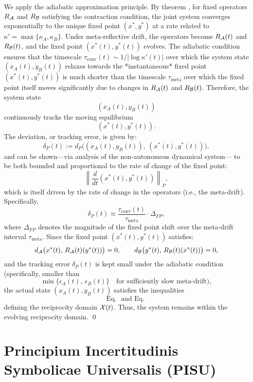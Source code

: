 \begin{demonstratio}
\label{demonstratio:bk7_meta_drift_reflective_tracking}
We apply the adiabatic approximation principle. By theorem , for fixed operators \(R_{\mathcal{A}}\) and \(R_{\mathcal{B}}\) satisfying the contraction condition, the joint system converges exponentially to the unique fixed point \((x^*, y^*)\) at a rate related to \(\kappa' = \max\{\kappa_A, \kappa_B\}\). Under meta-reflective drift, the operators become \(R_{\mathcal{A}}(t)\) and \(R_{\mathcal{B}}(t)\), and the fixed point \((x^*(t), y^*(t))\) evolves.
The adiabatic condition ensures that the timescale \(\tau_{\mathrm{conv}}(t) \sim 1/|\log \kappa'(t)|\) over which the system state \((x_A(t), y_B(t))\) relaxes towards the *instantaneous* fixed point \((x^*(t), y^*(t))\) is much shorter than the timescale \(\tau_{\mathrm{meta}}\) over which the fixed point itself moves significantly due to changes in \(R_{\mathcal{A}}(t)\) and \(R_{\mathcal{B}}(t)\).
Therefore, the system state
\[
(x_A(t), y_B(t))
\]
continuously tracks the moving equilibrium
\[
(x^*(t), y^*(t)).
\]
The deviation, or tracking error, is given by:
\[
\delta_P(t) := d_P\big( (x_A(t), y_B(t)),\ (x^*(t), y^*(t)) \big),
\]
and can be shown—via analysis of the non-autonomous dynamical system—
to be both bounded and proportional to the rate of change of the fixed point:
\[
\left\| \frac{d}{dt}(x^*(t), y^*(t)) \right\|_P,
\]
which is itself driven by the rate of change in the operators (i.e., the meta-drift).
Specifically,
\[
\delta_P(t) \approx \frac{\tau_{\mathrm{conv}}(t)}{\tau_{\mathrm{meta}}} \cdot \Delta_{FP},
\]
where \( \Delta_{FP} \) denotes the magnitude of the fixed point shift over the meta-drift interval \( \tau_{\mathrm{meta}} \).
Since the fixed point \( (x^*(t), y^*(t)) \) satisfies:
\[
d_{\mathcal{A}}\big(x^*(t),\, R_{\mathcal{A}}(t)(y^*(t))\big) = 0,
\qquad
d_{\mathcal{B}}\big(y^*(t),\, R_{\mathcal{B}}(t)(x^*(t))\big) = 0,
\]
and the tracking error \( \delta_P(t) \) is kept small under the adiabatic condition
(specifically, smaller than
\[
\min\{ \epsilon_A(t),\ \epsilon_B(t) \}
\quad \text{for sufficiently slow meta-drift}),
\]
the actual state \( (x_A(t), y_B(t)) \) satisfies the inequalities
\[
\text{Eq.~ and Eq.~}
\]
defining the reciprocity domain \( \mathcal{X}(t) \).
Thus, the system remains within the evolving reciprocity domain. \qed
\end{demonstratio}
\section{Principium Incertitudinis Symbolicae Universalis (PISU)}
\label{sec:bk7_pisu_universal_symbolic_uncertainty}


